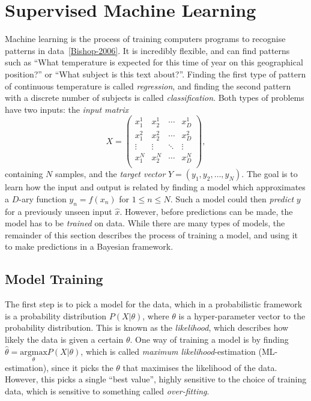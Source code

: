 \section{Supervised Machine Learning}
Machine learning is the process of training computers programs to
recognise patterns in data~\ref{Bishop-2006}. It is incredibly
flexible, and can find patterns such as ``What
temperature is expected for this time of year on this geographical
position?'' or ``What subject is this text about?''. Finding the first
type of pattern of continuous temperature is called
\textit{regression}, and finding the
second pattern with a discrete number of subjects is called
\textit{classification}. Both types of problems have two inputs: 
the \textit{input matrix}
\[X =
  \begin{pmatrix}
    x_{1}^{1} & x_{2}^{1} & \cdots & x_{D}^{1} \\
    x_{1}^{2} & x_{2}^{2} & \cdots & x_{D}^{2} \\
    \vdots  & \vdots  & \ddots & \vdots  \\
    x_{1}^{N} & x_{2}^{N} & \cdots & x_{D}^{N} \\
  \end{pmatrix},
\]
containing $N$ samples, and the \textit{target vector} $Y = (y_{1},
y_{2}, \dots, y_{N})$. The
goal is to learn how the input and output is related by finding a model which approximates a $D$-ary function $y_n =
f(x_n)$ for $1 \leq n \leq N$. Such a model could then
\textit{predict} $y$ for a previously unseen input $\hat{x}$. However,
before predictions can be made, the model has to be \textit{trained}
on data. While there are many types of models, the remainder of this
section describes the process of training a model,
and using it to make predictions in a Bayesian framework.

\subsection{Model Training}
The first step is to pick a model for the data, which in a probabilistic
framework is a probability distribution $P(X \vert \theta)$, where
$\theta$ is a hyper-parameter vector to the probability distribution.
This is known as the \textit{likelihood}, which describes how likely
the data is given a certain $\theta$. One way of training a model is
by finding $\hat{\theta} = \underset{\theta}{\mathrm{argmax}} P(X \vert \theta)$, 
which is called \textit{maximum likelihood}-estimation (ML-estimation), since it picks the
$\theta$ that maximises the likelihood of the data. However, this picks a single
``best value'', highly sensitive to the choice of training data, which is sensitive to something called \textit{over-fitting}.

